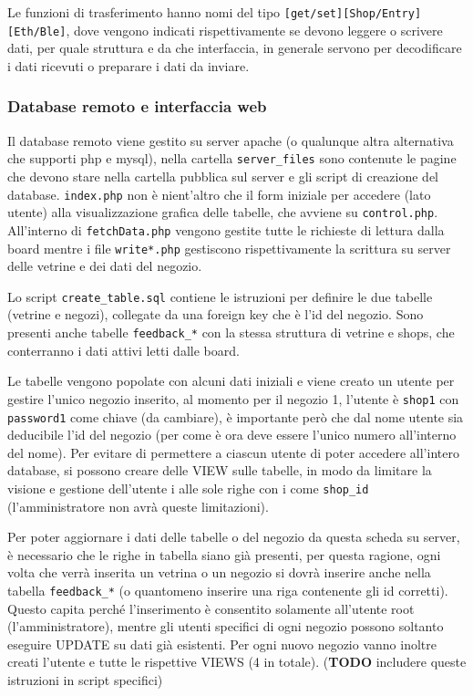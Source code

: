 Le funzioni di trasferimento hanno nomi del tipo \texttt{[get/set][Shop/Entry][Eth/Ble]}, dove vengono indicati rispettivamente se devono leggere o scrivere dati, per quale struttura e da che interfaccia, in generale servono per decodificare i dati ricevuti o preparare i dati da inviare.

\subsubsection{Database remoto e interfaccia web}

Il database remoto viene gestito su server apache (o qualunque altra alternativa che supporti php e mysql), nella cartella \texttt{server\_files} sono contenute le pagine che devono stare nella cartella pubblica sul server e gli script di creazione del database. \texttt{index.php} non \`e nient'altro che il form iniziale per accedere (lato utente) alla visualizzazione grafica delle tabelle, che avviene su \texttt{control.php}. All'interno di \texttt{fetchData.php} vengono gestite tutte le richieste di lettura dalla board mentre i file \texttt{write*.php} gestiscono rispettivamente la scrittura su server delle vetrine e dei dati del negozio.

Lo script \texttt{create\_table.sql} contiene le istruzioni per definire le due tabelle (vetrine e negozi), collegate da una foreign key che \`e l'id del negozio. Sono presenti anche tabelle \texttt{feedback\_*} con la stessa struttura di vetrine e shops, che conterranno i dati attivi letti dalle board.

Le tabelle vengono popolate con alcuni dati iniziali e viene creato un utente per gestire l'unico negozio inserito, al momento per il negozio 1, l'utente \`e \texttt{shop1} con \texttt{password1} come chiave (da cambiare), \`e importante per\`o che dal nome utente sia deducibile l'id del negozio (per come \`e ora deve essere l'unico numero all'interno del nome). Per evitare di permettere a ciascun utente di poter accedere all'intero database, si possono creare delle VIEW sulle tabelle, in modo da limitare la visione e gestione dell'utente i alle sole righe con i come \texttt{shop\_id} (l'amministratore non avr\`a queste limitazioni).

Per poter aggiornare i dati delle tabelle o del negozio da questa scheda su server, \`e necessario che le righe in tabella siano gi\`a presenti, per questa ragione, ogni volta che verr\`a inserita un vetrina o un negozio si dovr\`a inserire anche nella tabella \texttt{feedback\_*} (o quantomeno inserire una riga contenente gli id corretti). Questo capita perch\'e l'inserimento \`e consentito solamente all'utente root (l'amministratore), mentre gli utenti specifici di ogni negozio possono soltanto eseguire UPDATE su dati gi\`a esistenti. Per ogni nuovo negozio vanno inoltre creati l'utente e tutte le rispettive VIEWS (4 in totale). (\textbf{TODO} includere queste istruzioni in script specifici) 

